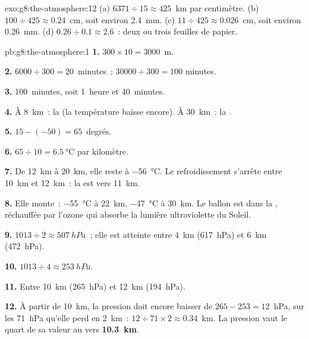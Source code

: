 \begin{solution}{exo:g8:the-atmosphere:12}
(a) $6371 \div 15 \approx 425$~km par centimètre. (b) $100 \div 425
\approx 0.24$~cm, soit environ \qty{2.4}{mm}. (c) $11 \div 425 \approx
0.026$~cm, soit environ \qty{0.26}{mm}. (d) $0.26 \div 0.1 \approx 2.6$~:
deux ou trois feuilles de papier.
\end{solution}

\begin{solution}{pb:g8:the-atmosphere:1}
\textbf{1.} $300 \times 10 = 3000$~m.

\textbf{2.} $6000 \div 300 = 20$~minutes~; $\num{30000} \div 300 = 100$
minutes.

\textbf{3.} 100~minutes, soit 1~heure et 40~minutes.

\textbf{4.} À \qty{8}{km}~: la  (la température baisse
encore). À \qty{30}{km}~: la .

\textbf{5.} $15 - (-50) = 65$~degrés.

\textbf{6.} $65 \div 10 = \qty{6.5}{\degreeCelsius}$ par kilomètre.

\textbf{7.} De \qty{12}{km} à \qty{20}{km}, elle reste à
\qty{-56}{\degreeCelsius}. Le refroidissement s'arrête entre \qty{10}{km}
et \qty{12}{km}~: la  est vers \qty{11}{km}.

\textbf{8.} Elle monte~: \qty{-55}{\degreeCelsius} à \qty{22}{km},
\qty{-47}{\degreeCelsius} à \qty{30}{km}. Le ballon est dans la
, réchauffée par l'ozone qui absorbe la lumière ultraviolette
du Soleil.

\textbf{9.} $1013 \div 2 \approx \qty{507}{hPa}$~; elle est atteinte entre
\qty{4}{km} (\qty{617}{hPa}) et \qty{6}{km} (\qty{472}{hPa}).

\textbf{10.} $1013 \div 4 \approx \qty{253}{hPa}$.

\textbf{11.} Entre \qty{10}{km} (\qty{265}{hPa}) et \qty{12}{km}
(\qty{194}{hPa}).

\textbf{12.} À partir de \qty{10}{km}, la pression doit encore baisser de $265 - 253 =
12$~hPa, sur les 71~hPa qu'elle perd en 2~km~: $12 \div 71 \times 2
\approx 0.34$~km. La pression vaut le quart de sa valeur au  vers \textbf{\qty{10.3}{km}}.
\end{solution}
